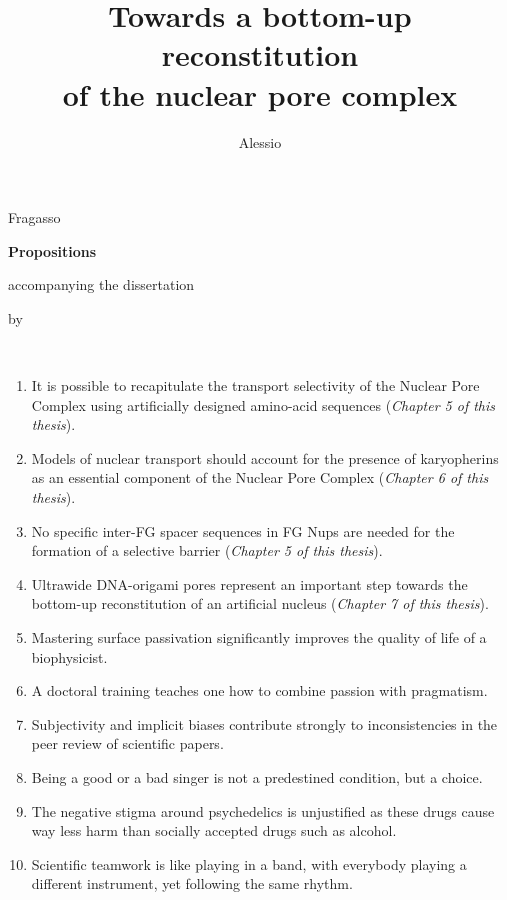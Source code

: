 \documentclass{dissertation}
\begin{document}
\title[]{Towards a bottom-up reconstitution  \\[2pt]of the nuclear pore complex}
\author{Alessio}{Fragasso}

\begin{center}

{\Large\titlefont\bfseries Propositions}

\bigskip

accompanying the dissertation

\bigskip

{\makeatletter
\titlestyle\bfseries\large\@title
\makeatother}

{\makeatletter
\ifx\@subtitle\undefined\else
    \titlefont\titleshape\@subtitle
\fi
\makeatother}

\bigskip

by

\bigskip

\makeatletter
{\large\titlefont\bfseries\@firstname\ {\titleshape\@lastname}}
\makeatother

\end{center}

\bigskip
\bigskip

\begin{enumerate}

\item It is possible to recapitulate the transport selectivity of the Nuclear Pore Complex using artificially designed amino-acid sequences (\emph{Chapter 5 of this thesis}).
\item Models of nuclear transport should account for the presence of karyopherins as an essential component of the Nuclear Pore Complex (\emph{Chapter 6 of this thesis}).
\item No specific inter-FG spacer sequences in FG Nups are needed for the formation of a selective barrier (\emph{Chapter 5 of this thesis}).
\item Ultrawide DNA-origami pores represent an important step towards the bottom-up reconstitution of an artificial nucleus (\emph{Chapter 7 of this thesis}).
\item Mastering surface passivation significantly improves the quality of life of a biophysicist.
\item A doctoral training teaches one how to combine passion with pragmatism.
\item Subjectivity and implicit biases contribute strongly to inconsistencies in the peer review of scientific papers.
\item Being a good or a bad singer is not a predestined condition, but a choice.
\item The negative stigma around psychedelics is unjustified as these drugs cause way less harm than socially accepted drugs such as alcohol.
\item Scientific teamwork is like playing in a band, with everybody playing a different instrument, yet following the same rhythm.


\end{enumerate}
\end{document}
